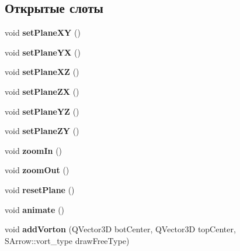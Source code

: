 \subsection*{Открытые слоты}
\begin{DoxyCompactItemize}
\item 
\mbox{\label{class_main_field_a2b3d5739b4372265ac6f216c02b0f026}} 
void {\bfseries set\+Plane\+XY} ()
\item 
\mbox{\label{class_main_field_abcc59b81bf7b1e0c9105226f568d64c6}} 
void {\bfseries set\+Plane\+YX} ()
\item 
\mbox{\label{class_main_field_af49ba412f1d459f55687216975bd2863}} 
void {\bfseries set\+Plane\+XZ} ()
\item 
\mbox{\label{class_main_field_aa994af31cd18c5454abccfdce9d6e450}} 
void {\bfseries set\+Plane\+ZX} ()
\item 
\mbox{\label{class_main_field_acaf500b463a194ddc89f300a6965fe37}} 
void {\bfseries set\+Plane\+YZ} ()
\item 
\mbox{\label{class_main_field_aeb9180272f8dbac56e1f77135972c0ed}} 
void {\bfseries set\+Plane\+ZY} ()
\item 
\mbox{\label{class_main_field_afc5570dac99996958b23d83e450a8e2f}} 
void {\bfseries zoom\+In} ()
\item 
\mbox{\label{class_main_field_a61ca850a83af9eb2c80b71c11179222d}} 
void {\bfseries zoom\+Out} ()
\item 
\mbox{\label{class_main_field_a68e343e8b30487d9076a2f36028bbd34}} 
void {\bfseries reset\+Plane} ()
\item 
\mbox{\label{class_main_field_ad67a5407890100be7913be1329db4241}} 
void {\bfseries animate} ()
\item 
\mbox{\label{class_main_field_ae9729564292fcd03862b540cea83db57}} 
void {\bfseries add\+Vorton} (Q\+Vector3D bot\+Center, Q\+Vector3D top\+Center, S\+Arrow\+::vort\+\_\+type draw\+Free\+Type)

\end{DoxyCompactItemize}
